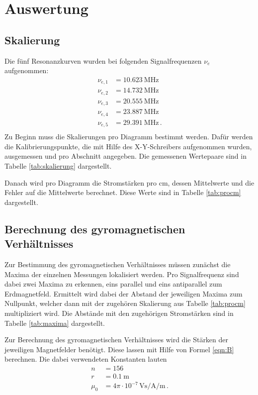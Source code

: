 \section{Auswertung}
\subsection{Skalierung}
Die fünf Resonanzkurven wurden bei folgenden Signalfrequenzen $\nu_e$ aufgenommen:
\begin{align*}
  \nu_{e, 1} &= \SI{10.623}{\mega\hertz} \\
  \nu_{e, 2} &= \SI{14.732}{\mega\hertz} \\
  \nu_{e, 3} &= \SI{20.555}{\mega\hertz} \\
  \nu_{e, 4} &= \SI{23.887}{\mega\hertz} \\
  \nu_{e, 5} &= \SI{29.391}{\mega\hertz}\, . \\
\end{align*}
Zu Beginn muss die Skalierungen pro Diagramm bestimmt werden. Dafür
werden die Kalibrierungspunkte, die mit Hilfe des X-Y-Schreibers aufgenommen wurden,
ausgemessen
und pro Abschnitt angegeben. Die gemessenen Wertepaare sind in Tabelle
\ref{tab:skalierung} dargestellt.


Danach wird pro Diagramm die Stromstärken pro $\si{\centi\meter}$, dessen
Mittelwerte und die Fehler auf die Mittelwerte berechnet. Diese Werte sind
in Tabelle \ref{tab:procm} dargestellt.



\subsection{Berechnung des gyromagnetischen Verhältnisses}
Zur Bestimmung des gyromagnetischen Verhältnisses müssen zunächst die Maxima
der einzelnen Messungen lokalisiert werden. Pro Signalfrequenz sind dabei zwei
Maxima zu erkennen, eins parallel und eins antiparallel zum Erdmagnetfeld.
Ermittelt wird dabei der Abstand der jeweiligen Maxima zum Nullpunkt, welcher
dann mit der zugehören Skalierung aus Tabelle \ref{tab:procm} multipliziert
wird. Die Abstände mit den zugehörigen Stromstärken sind in Tabelle
\ref{tab:maxima} dargestellt.



Zur Berechnung des gyromagnetischen Verhältnisses wird die Stärken der jeweiligen
Magnetfelder benötigt. Diese lassen mit Hilfe von Formel \eqref{eqn:B}
berechnen. Die dabei verwendeten Konstanten \cite{skript} \cite{indu} lauten
\begin{align*}
  n &= 156 \\
  r &= \SI{0.1}{\meter} \\
  \mu_0 &= 4 \pi \cdot 10^{-7}\, \si{\volt\second\per\ampere\per\meter} \, .\\
\end{align*}

